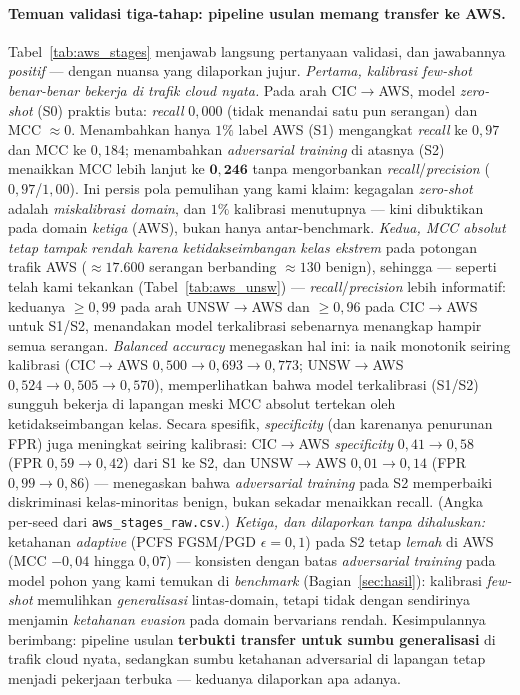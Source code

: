 \documentclass[11pt,a4paper]{article}
\begin{document}
\paragraph{Temuan validasi tiga-tahap: pipeline usulan memang transfer ke AWS.}
Tabel~\ref{tab:aws_stages} menjawab langsung pertanyaan validasi, dan jawabannya
\emph{positif} --- dengan nuansa yang dilaporkan jujur. \emph{Pertama, kalibrasi
few-shot benar-benar bekerja di trafik cloud nyata.} Pada arah CIC$\rightarrow$AWS,
model \emph{zero-shot} (S0) praktis buta: \emph{recall} $0{,}000$ (tidak menandai
satu pun serangan) dan MCC $\approx 0$. Menambahkan hanya $1\%$ label AWS (S1)
mengangkat \emph{recall} ke $0{,}97$ dan MCC ke $0{,}184$; menambahkan
\emph{adversarial training} di atasnya (S2) menaikkan MCC lebih lanjut ke
$\mathbf{0{,}246}$ tanpa mengorbankan \emph{recall}/\emph{precision}
($0{,}97$/$1{,}00$). Ini persis pola pemulihan yang kami klaim: kegagalan
\emph{zero-shot} adalah \emph{miskalibrasi domain}, dan $1\%$ kalibrasi
menutupnya --- kini dibuktikan pada domain \emph{ketiga} (AWS), bukan hanya
antar-benchmark. \emph{Kedua, MCC absolut tetap tampak rendah karena
ketidakseimbangan kelas ekstrem} pada potongan trafik AWS
($\approx 17{.}600$ serangan berbanding $\approx 130$ benign), sehingga --- seperti
telah kami tekankan (Tabel~\ref{tab:aws_unsw}) --- \emph{recall}/\emph{precision}
lebih informatif: keduanya $\ge 0{,}99$ pada arah UNSW$\rightarrow$AWS dan
$\ge 0{,}96$ pada CIC$\rightarrow$AWS untuk S1/S2, menandakan model terkalibrasi
sebenarnya menangkap hampir semua serangan. \emph{Balanced accuracy} menegaskan hal ini: ia naik monotonik seiring kalibrasi (CIC$\rightarrow$AWS $0{,}500 \to 0{,}693 \to 0{,}773$; UNSW$\rightarrow$AWS $0{,}524 \to 0{,}505 \to 0{,}570$), memperlihatkan bahwa model terkalibrasi (S1/S2) sungguh bekerja di lapangan meski MCC absolut tertekan oleh ketidakseimbangan kelas. Secara spesifik, \emph{specificity} (dan karenanya penurunan FPR) juga meningkat seiring kalibrasi: CIC$\rightarrow$AWS \emph{specificity} $0{,}41\to0{,}58$ (FPR $0{,}59\to0{,}42$) dari S1 ke S2, dan UNSW$\rightarrow$AWS $0{,}01\to0{,}14$ (FPR $0{,}99\to0{,}86$) --- menegaskan bahwa \emph{adversarial training} pada S2 memperbaiki diskriminasi kelas-minoritas benign, bukan sekadar menaikkan recall. (Angka per-seed dari \texttt{aws\_stages\_raw.csv}.) \emph{Ketiga, dan dilaporkan tanpa
dihaluskan:} ketahanan \emph{adaptive} (PCFS FGSM/PGD $\epsilon{=}0{,}1$) pada S2
tetap \emph{lemah} di AWS (MCC $-0{,}04$ hingga $0{,}07$) --- konsisten dengan batas
\emph{adversarial training} pada model pohon yang kami temukan di
\emph{benchmark} (Bagian~\ref{sec:hasil}): kalibrasi \emph{few-shot} memulihkan
\emph{generalisasi} lintas-domain, tetapi tidak dengan sendirinya menjamin
\emph{ketahanan evasion} pada domain bervarians rendah. Kesimpulannya berimbang:
pipeline usulan \textbf{terbukti transfer untuk sumbu generalisasi} di trafik cloud
nyata, sedangkan sumbu ketahanan adversarial di lapangan tetap menjadi pekerjaan
terbuka --- keduanya dilaporkan apa adanya.
\end{document}

